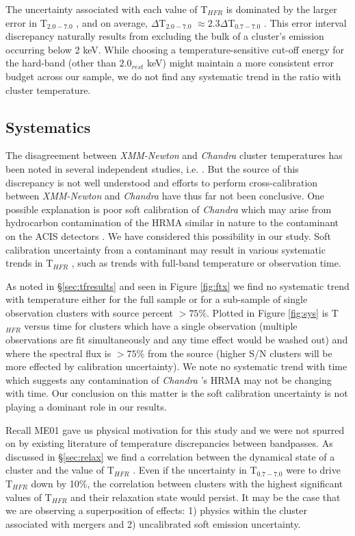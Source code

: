 \documentclass{emulateapj}
\newcommand{\tf}{T$_{HFR}$ }
\newcommand{\hard}{T$_{2.0-7.0}$ }
\newcommand{\full}{T$_{0.7-7.0}$ }
\newcommand{\chan}{{\textit{Chandra }}}
\newcommand{\xmm}{{\textit{XMM-Newton }}}
\begin{document}
The uncertainty associated with each value of \tf is dominated by
the larger error in \hard, and on average, $\Delta$\hard$\approx
2.3\Delta$\full. This error interval discrepancy naturally results
from excluding the bulk of a cluster's emission occurring below 2
keV. While choosing a temperature-sensitive cut-off energy for the
hard-band (other than $2.0_{rest}$ keV) might maintain a more consistent
error budget across our sample, we do not find any systematic trend in
the ratio with cluster temperature.

\subsection{Systematics} \label{sec:sys}

The disagreement between \xmm and \chan cluster temperatures has been
noted in several independent studies,
i.e. \cite{2005ApJ...628..655V,chanxmmdis}. But the source of this
discrepancy is not well understood and efforts to perform
cross-calibration between \xmm and \chan have thus far not been
conclusive. One possible explanation is poor soft calibration of \chan
which may arise from hydrocarbon contamination of the HRMA similar in
nature to the contaminant on the ACIS detectors
\citep{aciscontaminant}. We have considered this possibility in our
study. Soft calibration uncertainty from a contaminant may result in
various systematic trends in \tf, such as trends with full-band
temperature or observation time.

As noted in \S\ref{sec:tfresults} and
seen in Figure \ref{fig:ftx} we find no systematic trend with
temperature either for the full sample or for a sub-sample of single
observation clusters with source percent $> 75\%$. Plotted in Figure
\ref{fig:sys} is \tf versus time for clusters which have a single
observation (multiple observations are fit simultaneously and any time
effect would be washed out) and where the spectral flux is $> 75\%$
from the source (higher S/N clusters will be more effected by
calibration uncertainty). We note no systematic trend with time which
suggests any contamination of \chan's HRMA may not be changing with
time. Our conclusion on this matter is the soft calibration
uncertainty is not playing a dominant role in our results.

Recall ME01 gave us physical motivation for this study and we were not spurred on
by existing literature of temperature discrepancies between
bandpasses. As discussed in \S\ref{sec:relax} we find a correlation
between the dynamical state of a cluster and the value of \tf. Even if
the uncertainty in \full were to drive \tf down by 10\%, the
correlation between clusters with the highest significant values of \tf
and their relaxation state would persist. It may be the case that
we are observing a superposition of effects: 1) physics within the
cluster associated with mergers and 2) uncalibrated soft emission
uncertainty.
\end{document}
